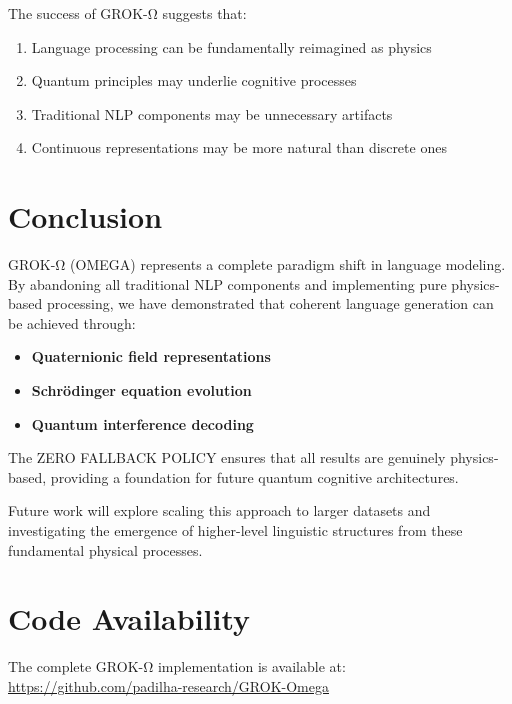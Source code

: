 \documentclass[11pt,a4paper]{article}
\begin{document}
The success of GROK-Ω suggests that:
\begin{enumerate}
\item Language processing can be fundamentally reimagined as physics
\item Quantum principles may underlie cognitive processes
\item Traditional NLP components may be unnecessary artifacts
\item Continuous representations may be more natural than discrete ones
\end{enumerate}

\section{Conclusion}

GROK-Ω (OMEGA) represents a complete paradigm shift in language modeling. By abandoning all traditional NLP components and implementing pure physics-based processing, we have demonstrated that coherent language generation can be achieved through:

\begin{itemize}
\item \textbf{Quaternionic field representations}
\item \textbf{Schrödinger equation evolution}
\item \textbf{Quantum interference decoding}
\end{itemize}

The ZERO FALLBACK POLICY ensures that all results are genuinely physics-based, providing a foundation for future quantum cognitive architectures.

Future work will explore scaling this approach to larger datasets and investigating the emergence of higher-level linguistic structures from these fundamental physical processes.

\section*{Code Availability}

The complete GROK-Ω implementation is available at: \url{https://github.com/padilha-research/GROK-Omega}



\end{document}
